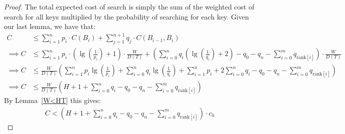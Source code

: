 \documentclass[]{beamer}
\theoremstyle{plain}
\begin{document}
\begin{frame}
\begin{proof}
The total expected cost of search is simply the sum of the weighted cost of search for all keys multiplied by the probability of searching for each key. Given our last lemma, we have that:
\begin{align*}
C &\leq \sum_{i=1}^{n} p_i\cdot C(B_i) + \sum_{j=1}^{n+1} q_j\cdot C(B_{i-1},B_i) \\
\implies C &\leq \sum_{i=1}^{n} p_i\cdot (\lg(\frac{1}{p_i})+1)\cdot \frac{W}{D(T)} + \left(\sum_{i=0}^{n} q_i(\lg(\frac{1}{q_i})+2) - q_0 - q_n -  \sum_{i=0}^m q_{\text{rank}[i]} \right)\cdot \frac{W}{D(T)} \\
\implies C &\leq \frac{W}{D(T)} \left(\sum_{i=1}^{n} p_i\lg(\frac{1}{p_i}) + \sum_{i=0}^{n} q_i\lg(\frac{1}{q_i}) + \sum_{i=1}^{n} p_i + 2\sum_{i=0}^{n} q_i - q_0 - q_n - \sum_{i=0}^m q_{\text{rank}[i]} \right) \\
\implies C &\leq  \frac{W}{D(T)} \left(H + 1 + \sum_{i=0}^n q_i - q_0 - q_n - \sum_{i=0}^m q_{\text{rank}[i]} \right)
\end{align*}
By Lemma~\ref{W<HT} this gives:
\begin{align*}
C < \left(H + 1 + \sum_{i=0}^n q_i - q_0 - q_n - \sum_{i=0}^m q_{\text{rank}[i]} \right) \cdot  c_h
\end{align*}

\end{proof}
\end{frame}
\end{document}
